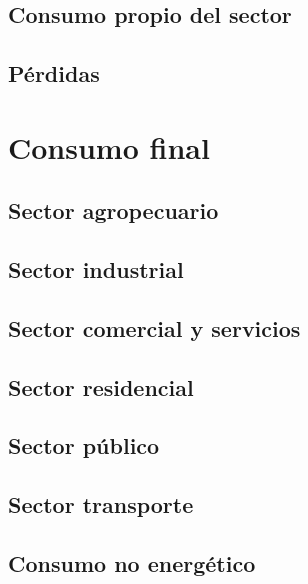 \documentclass{sener2025}
\begin{document}
\subsection{Consumo propio del sector}




\subsection{Pérdidas}





\section{Consumo final}




\subsection{Sector agropecuario}




\subsection{Sector industrial}




\subsection{Sector comercial y servicios}




\subsection{Sector residencial}




\subsection{Sector público}




\subsection{Sector transporte}




\subsection{Consumo no energético}
\end{document}
